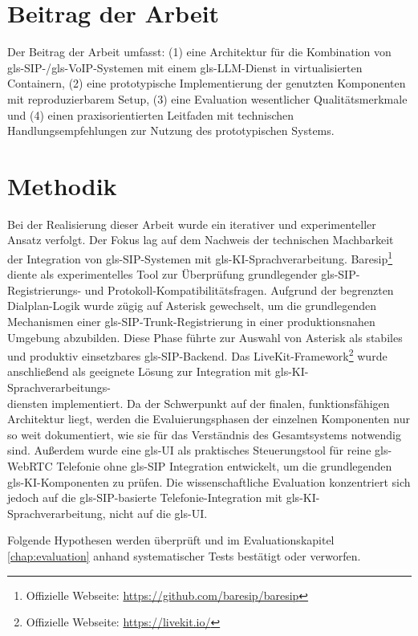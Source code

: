 \section{Beitrag der Arbeit}
Der Beitrag der Arbeit umfasst: (1) eine Architektur für die Kombination von \gls{gls-SIP}-/\gls{gls-VoIP}-Systemen mit einem \gls{gls-LLM}-Dienst in virtualisierten Containern, (2) eine prototypische Implementierung der genutzten Komponenten mit reproduzierbarem Setup, (3) eine Evaluation wesentlicher Qualitätsmerkmale und (4) einen praxisorientierten Leitfaden mit technischen Handlungsempfehlungen zur Nutzung des prototypischen Systems. \\

\section{Methodik}

Bei der Realisierung dieser Arbeit wurde ein iterativer und experimenteller Ansatz verfolgt. Der Fokus lag auf dem Nachweis der technischen Machbarkeit der Integration von \gls{gls-SIP}-Systemen mit \gls{gls-KI}-Sprachverarbeitung. Baresip\footnote{Offizielle Webseite: \url{https://github.com/baresip/baresip}} diente als experimentelles Tool zur Überprüfung grundlegender \gls{gls-SIP}-Registrierungs- und Protokoll-Kompatibilitätsfragen. Aufgrund der begrenzten Dialplan-Logik wurde zügig auf Asterisk gewechselt, um die grundlegenden Mechanismen einer \gls{gls-SIP}-Trunk-Registrierung in einer produktionsnahen Umgebung abzubilden. Diese Phase führte zur Auswahl von Asterisk als stabiles und produktiv einsetzbares \gls{gls-SIP}-Backend. Das LiveKit-Framework\footnote{Offizielle Webseite: \url{https://livekit.io/}} wurde anschlie\ss end als geeignete Lösung zur Integration mit \gls{gls-KI}-Sprachverarbeitungs-\\diensten implementiert. Da der Schwerpunkt auf der finalen, funktionsfähigen Architektur liegt, werden die Evaluierungsphasen der einzelnen Komponenten nur so weit dokumentiert, wie sie für das Verständnis des Gesamtsystems notwendig sind. Außerdem wurde eine \gls{gls-UI} als praktisches Steuerungstool für reine \gls{gls-WebRTC} Telefonie ohne \gls{gls-SIP} Integration entwickelt, um die grundlegenden \gls{gls-KI}-Komponenten zu prüfen. Die wissenschaftliche Evaluation konzentriert sich jedoch auf die \gls{gls-SIP}-basierte Telefonie-Integration mit \gls{gls-KI}-Sprachverarbeitung, nicht auf die \gls{gls-UI}.

Folgende Hypothesen werden überprüft und im Evaluationskapitel \ref{chap:evaluation} anhand systematischer Tests bestätigt oder verworfen.

